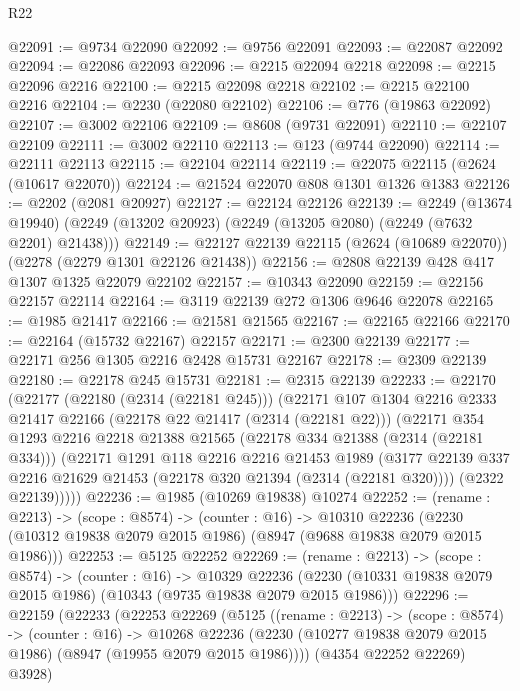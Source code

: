 \begin{lexlean}{R22}
\begin{coremodule}
@22091 := @9734 @22090
@22092 := @9756 @22091
@22093 := @22087 @22092
@22094 := @22086 @22093
@22096 := @2215 @22094 @2218
@22098 := @2215 @22096 @2216
@22100 := @2215 @22098 @2218
@22102 := @2215 @22100 @2216
@22104 := @2230 (@22080 @22102)
@22106 := @776 (@19863 @22092)
@22107 := @3002 @22106
@22109 := @8608 (@9731 @22091)
@22110 := @22107 @22109
@22111 := @3002 @22110
@22113 := @123 (@9744 @22090)
@22114 := @22111 @22113
@22115 := @22104 @22114
@22119 := @22075 @22115 (@2624 (@10617 @22070))
@22124 := @21524 @22070 @808 @1301 @1326 @1383
@22126 := @2202 (@2081 @20927)
@22127 := @22124 @22126
@22139 := @2249
    (@13674 @19940)
    (@2249 (@13202 @20923) (@2249 (@13205 @2080) (@2249 (@7632 @2201) @21438)))
@22149 := @22127 @22139 @22115 (@2624 (@10689 @22070)) (@2278 (@2279 @1301 @22126 @21438))
@22156 := @2808 @22139 @428 @417 @1307 @1325 @22079 @22102
@22157 := @10343 @22090
@22159 := @22156 @22157 @22114
@22164 := @3119 @22139 @272 @1306 @9646 @22078
@22165 := @1985 @21417
@22166 := @21581 @21565
@22167 := @22165 @22166
@22170 := @22164 (@15732 @22167) @22157
@22171 := @2300 @22139
@22177 := @22171 @256 @1305 @2216 @2428 @15731 @22167
@22178 := @2309 @22139
@22180 := @22178 @245 @15731
@22181 := @2315 @22139
@22233 := @22170
    (@22177
      (@22180 (@2314 (@22181 @245)))
      (@22171
        @107
        @1304
        @2216
        @2333
        @21417
        @22166
        (@22178 @22 @21417 (@2314 (@22181 @22)))
        (@22171
          @354
          @1293
          @2216
          @2218
          @21388
          @21565
          (@22178 @334 @21388 (@2314 (@22181 @334)))
          (@22171
            @1291
            @118
            @2216
            @2216
            @21453
            @1989
            (@3177 @22139 @337 @2216 @21629 @21453 (@22178 @320 @21394 (@2314 (@22181 @320))))
            (@2322 @22139)))))
@22236 := @1985 (@10269 @19838) @10274
@22252 := (rename : @2213) ->
  (scope : @8574) ->
  (counter : @16) ->
  @10310 @22236 (@2230 (@10312 @19838 @2079 @2015 @1986) (@8947 (@9688 @19838 @2079 @2015 @1986)))
@22253 := @5125 @22252
@22269 := (rename : @2213) ->
  (scope : @8574) ->
  (counter : @16) ->
  @10329 @22236 (@2230 (@10331 @19838 @2079 @2015 @1986) (@10343 (@9735 @19838 @2079 @2015 @1986)))
@22296 := @22159
    (@22233
      (@22253
        @22269
        (@5125
          ((rename : @2213) ->
          (scope : @8574) ->
          (counter : @16) ->
          @10268
            @22236
            (@2230 (@10277 @19838 @2079 @2015 @1986) (@8947 (@19955 @2079 @2015 @1986))))
          (@4354 @22252 @22269)
          @3928)

\end{coremodule}
\end{lexlean}
